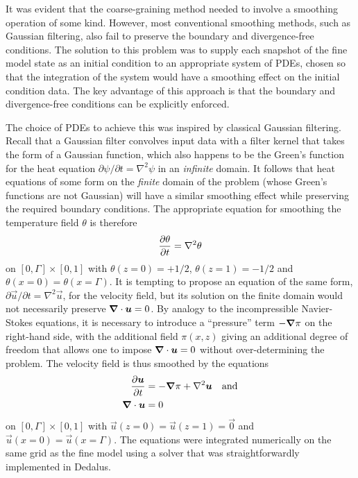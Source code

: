 \documentclass[../main.tex]{subfiles}
\begin{document}
It was evident that the coarse-graining method needed to involve a smoothing
operation of some kind. However, most conventional smoothing methods, such as
Gaussian filtering, also fail to preserve the boundary and divergence-free
conditions. The solution to this problem was to supply each snapshot of the
fine model state as an initial condition to an appropriate system of PDEs,
chosen so that the integration of the system would have a smoothing effect on
the initial condition data. The key advantage of this approach is that the
boundary and divergence-free conditions can be explicitly enforced.

The choice of PDEs to achieve this was inspired by classical Gaussian
filtering. Recall that a Gaussian filter convolves input data with a filter
kernel that takes the form of a Gaussian function, which also happens to be the
Green's function for the heat equation $\partial \psi / \partial t = \nabla^2
\psi$ in an \emph{infinite} domain. It follows that heat equations of some form
on the \emph{finite} domain of the \rb{} problem (whose Green's functions are
not Gaussian) will have a similar smoothing effect while preserving the
required boundary conditions. The appropriate equation for smoothing the
temperature field $\theta$ is therefore
\begin{equation}
    \label{eqn:diffusion_theta}
    \frac{\partial \theta}{\partial t} = \nabla^2 \theta
\end{equation}
on $[0, \Gamma] \times [0, 1]$ with $\theta(z=0) = +1/2$, $\theta(z=1) = -1/2$
and $\theta(x=0) = \theta(x=\Gamma)$. It is tempting to propose an equation of
the same form, $\partial \vec{u} / \partial t = \nabla^2 \vec{u}$, for the
velocity field, but its solution on the finite domain would not necessarily
preserve $\bm{\nabla} \cdot \bm{u} = 0$. By analogy to the incompressible
Navier-Stokes equations, it is necessary to introduce a ``pressure'' term
$-\bm{\nabla}\pi$ on the right-hand side, with the additional field $\pi(x,z)$ giving
an additional degree of freedom that allows one to impose $\bm{\nabla} \cdot \bm{u}
= 0$ without over-determining the problem. The velocity field is thus
smoothed by the equations
\begin{align}
    \label{eqn:diffusion_u}
    \frac{\partial \bm{u}}{\partial t} &= -\bm{\nabla}\pi + \nabla^2 \bm{u} \quad \text{and} \\
    \label{eqn:diffusion_continuity}
    \bm{\nabla} \cdot \bm{u} &= 0
\end{align}
on $[0, \Gamma] \times [0, 1]$ with $\vec{u}(z=0) = \vec{u}(z=1) = \vec{0}$ and
$\vec{u}(x=0) = \vec{u}(x=\Gamma)$. The equations
 were integrated
numerically on the same grid as the fine model using a solver that was
straightforwardly implemented in Dedalus.
\end{document}

